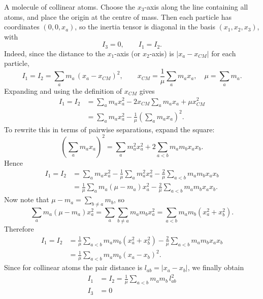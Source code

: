 \begin{subproblem}
{
A molecule of collinear atoms.
}
{
Choose the $x_3$-axis along the line containing all atoms, and place the origin at the centre of mass.  Then each particle has coordinates $(0,0,x_a)$, so the inertia tensor is diagonal in the basis
$(x_1,x_2,x_3)$, with
\begin{equation*}
    I_3 = 0, \qquad I_1 = I_2.
\end{equation*}
Indeed, since the distance to the $x_1$-axis (or $x_2$-axis) is $|x_a-x_{CM}|$ for each particle,
\begin{equation*}
    I_1 = I_2 = \sum_a m_a\,(x_a-x_{CM})^2,
    \qquad
    x_{CM}=\frac{1}{\mu}\sum_a m_a x_a,\quad \mu=\sum_a m_a.
\end{equation*}
Expanding and using the definition of $x_{CM}$ gives
\begin{align*}
    I_1=I_2
    &= \sum_a m_a x_a^2 - 2x_{CM}\sum_a m_a x_a + \mu x_{CM}^2 \\
    &= \sum_a m_a x_a^2 - \frac{1}{\mu}\left(\sum_a m_a x_a\right)^2.
\end{align*}
To rewrite this in terms of pairwise separations, expand the square:
\begin{equation*}
    \left(\sum_a m_a x_a\right)^2
    = \sum_a m_a^2 x_a^2 + 2\sum_{a<b} m_a m_b x_a x_b.
\end{equation*}
Hence
\begin{align*}
    I_1=I_2
    &= \sum_a m_a x_a^2
    -\frac{1}{\mu}\sum_a m_a^2 x_a^2
    -\frac{2}{\mu}\sum_{a<b} m_a m_b x_a x_b \\
    &= \frac{1}{\mu}\sum_a m_a(\mu-m_a)x_a^2
    -\frac{2}{\mu}\sum_{a<b} m_a m_b x_a x_b.
\end{align*}
Now note that $\mu-m_a=\sum_{b\neq a}m_b$, so
\begin{equation*}
    \sum_a m_a(\mu-m_a)x_a^2
    =\sum_a\sum_{b\neq a} m_a m_b x_a^2
    =\sum_{a<b} m_a m_b(x_a^2+x_b^2).
\end{equation*}
Therefore
\begin{align*}
    I_1=I_2
    &= \frac{1}{\mu}\sum_{a<b} m_a m_b(x_a^2+x_b^2)
    -\frac{2}{\mu}\sum_{a<b} m_a m_b x_a x_b \\
    &= \frac{1}{\mu}\sum_{a<b} m_a m_b (x_a-x_b)^2.
\end{align*}
Since for collinear atoms the pair distance is $l_{ab}=|x_a-x_b|$, we finally obtain
}
{
\begin{align*}
    I_1&=I_2=\frac{1}{\mu}\sum_{a<b} m_a m_b\, l_{ab}^2 \\
    I_3&=0
\end{align*}
}
\end{subproblem}

